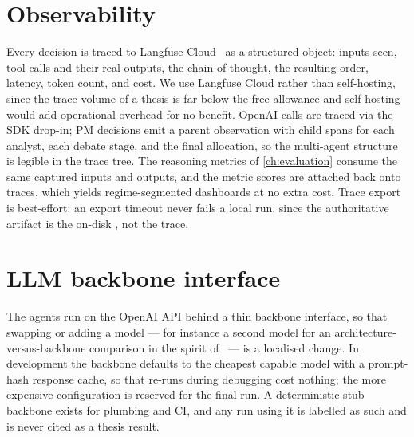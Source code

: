 \section{Observability}
\label{sec:observability}

Every decision is traced to Langfuse Cloud~\cite{langfuse2024} as a structured object:
inputs seen, tool calls and their real outputs, the chain-of-thought, the resulting order,
latency, token count, and cost. We use Langfuse Cloud rather than self-hosting, since the
trace volume of a thesis is far below the free allowance and self-hosting would add
operational overhead for no benefit. OpenAI calls are traced via the SDK drop-in; PM
decisions emit a parent observation with child spans for each analyst, each debate stage, and
the final allocation, so the multi-agent structure is legible in the trace tree. The
reasoning metrics of \cref{ch:evaluation} consume the same captured inputs and outputs, and
the metric scores are attached back onto traces, which yields regime-segmented dashboards at
no extra cost. Trace export is best-effort: an export timeout never fails a local run, since
the authoritative artifact is the on-disk , not the trace.

\section{LLM backbone interface}
\label{sec:backbone}

The agents run on the OpenAI API behind a thin backbone interface, so that swapping or
adding a model --- for instance a second model for an architecture-versus-backbone
comparison in the spirit of~\cite{ama2025} --- is a localised change. In development the
backbone defaults to the cheapest capable model with a prompt-hash response cache, so that
re-runs during debugging cost nothing; the more expensive configuration is reserved for the
final run. A deterministic stub backbone exists for plumbing and CI, and any run using it is
labelled as such and is never cited as a thesis result.

